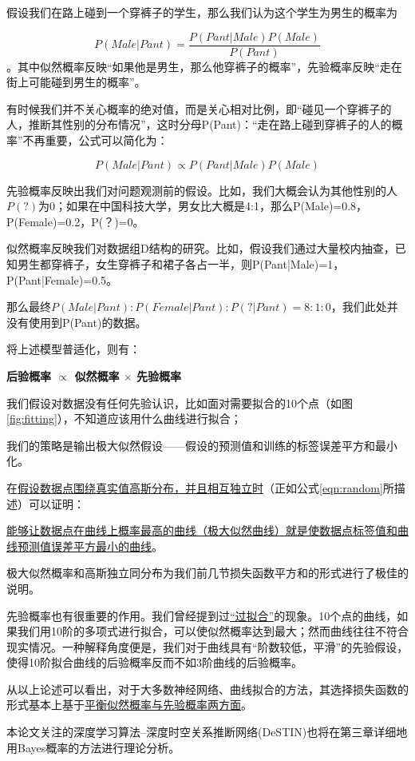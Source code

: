 假设我们在路上碰到一个穿裤子的学生，那么我们认为这个学生为男生的概率为

$$P(Male|Pant) = \dfrac{P(Pant|Male)P(Male)}{P(Pant)}$$。其中似然概率反映“如果他是男生，那么他穿裤子的概率”，先验概率反映“走在街上可能碰到男生的概率”。

有时候我们并不关心概率的绝对值，而是关心相对比例，即“碰见一个穿裤子的人，推断其性别的分布情况”，这时分母P(Pant)：“走在路上碰到穿裤子的人的概率”不再重要，公式可以简化为：

$$P(Male|Pant) \propto P(Pant|Male)P(Male)$$

先验概率反映出我们对问题观测前的假设。比如，我们大概会认为其他性别的人$P(?)$为0；如果在中国科技大学，男女比大概是4:1，那么P(Male)=0.8，P(Female)=0.2，P(？)=0。 

似然概率反映我们对数据组{D}结构的研究。比如，假设我们通过大量校内抽查，已知男生都穿裤子，女生穿裤子和裙子各占一半，则P(Pant|Male)=1，P(Pant|Female)=0.5。

那么最终$P(Male|Pant):P(Female|Pant):P(?|Pant) = 8:1:0$，我们此处并没有使用到P(Pant)的数据。

将上述模型普适化，则有：

\textbf{后验概率 $\propto$ 似然概率 $\times$ 先验概率}

我们假设对数据没有任何先验认识，比如面对需要拟合的10个点（如图\ref{fig:fitting}），不知道应该用什么曲线进行拟合；

我们的策略是输出极大似然假设——假设的预测值和训练的标签误差平方和最小化。

在\uline{假设数据点围绕真实值高斯分布，并且相互独立时}（正如公式\ref{eqn:random}所描述）可以证明\cite{standford_machine_learning_cs229}：

\uline{能够让数据点在曲线上概率最高的曲线（极大似然曲线）就是使数据点标签值和曲线预测值误差平方最小的曲线}。

极大似然概率和高斯独立同分布为我们前几节损失函数平方和的形式进行了极佳的说明。

先验概率也有很重要的作用。我们曾经提到过\uline{“过拟合”}的现象。10个点的曲线，如果我们用10阶的多项式进行拟合，可以使似然概率达到最大；然而曲线往往不符合现实情况。一种解释角度便是，我们对于曲线具有“阶数较低，平滑”的先验假设，使得10阶拟合曲线的后验概率反而不如3阶曲线的后验概率。

从以上论述可以看出，对于大多数神经网络、曲线拟合的方法，其选择损失函数的形式基本上基于\uline{平衡似然概率与先验概率两方面}。

本论文关注的深度学习算法--深度时空关系推断网络(DeSTIN)也将在第三章详细地用Bayes概率的方法进行理论分析。

